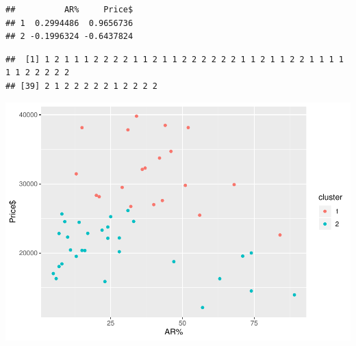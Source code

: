 \documentclass[]{article}
\newenvironment{Shaded}{\begin{snugshade}}{\end{snugshade}}
\newcommand{\KeywordTok}[1]{\textcolor[rgb]{0.13,0.29,0.53}{\textbf{#1}}}
\newcommand{\DataTypeTok}[1]{\textcolor[rgb]{0.13,0.29,0.53}{#1}}
\newcommand{\StringTok}[1]{\textcolor[rgb]{0.31,0.60,0.02}{#1}}
\newcommand{\OperatorTok}[1]{\textcolor[rgb]{0.81,0.36,0.00}{\textbf{#1}}}
\newcommand{\NormalTok}[1]{#1}
\begin{document}
\begin{verbatim}
##          AR%     Price$
## 1  0.2994486  0.9656736
## 2 -0.1996324 -0.6437824
\end{verbatim}

\begin{Shaded}
\end{Shaded}

\begin{verbatim}
##  [1] 1 2 1 1 1 2 2 2 2 1 1 2 1 1 2 2 2 2 2 2 1 1 2 1 1 2 2 1 1 1 1 1 1 2 2 2 2 2
## [39] 2 1 2 2 2 2 2 1 2 2 2 2
\end{verbatim}

\begin{Shaded}
\end{Shaded}

\begin{center}\includegraphics{project1_files/figure-latex/unnamed-chunk-5-2} \end{center}
\end{document}
